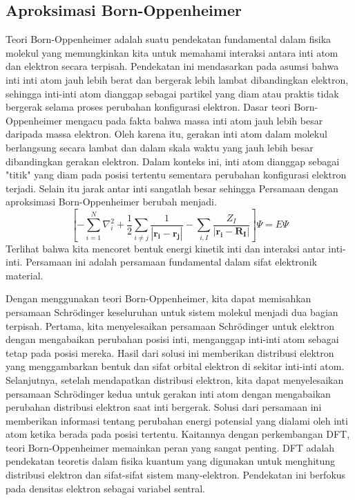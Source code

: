 \subsection{Aproksimasi Born-Oppenheimer}
Teori Born-Oppenheimer \citep{oppenheimer1927zur} adalah suatu pendekatan fundamental dalam fisika molekul yang memungkinkan kita untuk memahami interaksi antara inti atom dan elektron secara terpisah. Pendekatan ini mendasarkan pada asumsi bahwa inti inti atom jauh lebih berat dan bergerak lebih lambat dibandingkan elektron, sehingga inti-inti atom dianggap sebagai partikel yang diam atau praktis tidak bergerak selama proses perubahan konfigurasi elektron.
Dasar teori Born-Oppenheimer mengacu pada fakta bahwa massa inti atom jauh lebih besar daripada massa elektron. Oleh karena itu, gerakan inti atom dalam molekul berlangsung secara lambat dan dalam skala waktu yang jauh lebih besar dibandingkan gerakan elektron. Dalam konteks ini, inti atom dianggap sebagai "titik" yang diam pada posisi tertentu sementara perubahan konfigurasi elektron terjadi. Selain itu jarak antar inti sangatlah besar sehingga Persamaan \schro dengan aproksimasi Born-Oppenheimer berubah menjadi.
\begin{equation}
\left[-\sum_{i=1}^N \nabla_i^2+\frac{1}{2}\sum_{i\neq j}\frac{1}{|\mathbf{r_i}-\mathbf{r_j}|}-\sum_{i,I}\frac{Z_I}{|\mathbf{r_i}-\mathbf{R_I}|} \right]\Psi=E\Psi
\end{equation}
Terlihat bahwa kita mencoret bentuk energi kinetik inti dan interaksi antar inti-inti. Persamaan ini adalah persamaan fundamental dalam sifat elektronik material.

Dengan menggunakan teori Born-Oppenheimer, kita dapat memisahkan persamaan Schrödinger keseluruhan untuk sistem molekul menjadi dua bagian terpisah. Pertama, kita menyelesaikan persamaan Schrödinger untuk elektron dengan mengabaikan perubahan posisi inti, menganggap inti-inti atom sebagai tetap pada posisi mereka. Hasil dari solusi ini memberikan distribusi elektron yang menggambarkan bentuk dan sifat orbital elektron di sekitar inti-inti atom. Selanjutnya, setelah mendapatkan distribusi elektron, kita dapat menyelesaikan persamaan Schrödinger kedua untuk gerakan inti atom dengan mengabaikan perubahan distribusi elektron saat inti bergerak. Solusi dari persamaan ini memberikan informasi tentang perubahan energi potensial yang dialami oleh inti atom ketika berada pada posisi tertentu. Kaitannya dengan perkembangan DFT, teori Born-Oppenheimer memainkan peran yang sangat penting. DFT adalah pendekatan teoretis dalam fisika kuantum yang digunakan untuk menghitung distribusi elektron dan sifat-sifat sistem many-elektron. Pendekatan ini berfokus pada densitas elektron sebagai variabel sentral.

